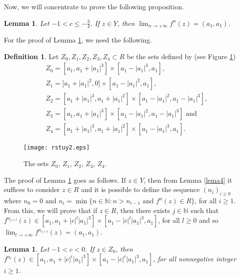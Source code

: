 \documentclass[11pt]{amsart}
\newtheorem{lemma}[theorem]{Lemma}
\theoremstyle{definition}
\newtheorem{definition}[theorem]{Definition}
\begin{document}
Now, we will concentrate to prove the following proposition.

\begin{lemma}
	Let $-1<c\leq -\frac{3}{4}$. If $z\in Y$, then $\displaystyle\lim_{n\to+\infty}f^n(z)=(a_1,a_1)$. \label{lemaaziai}
\end{lemma}

For the proof of Lemma \ref{lemaaziai}, we need the following.

\begin{definition}
	Let $Z_0, Z_1, Z_2, Z_3,Z_4 \subset R$ be the sets defined by (see Figure \ref{rstuy2})
	$$
	\begin{array}{l}
	Z_0=[a_1,a_1+|a_1|^3]\times [a_1-|a_1|^3,a_1], \\
	Z_1=]a_1+|a_1|^2,0]\times[a_1-|a_1|^2,a_1], \\
	Z_2=[a_1+|a_1|^3,a_1+|a_1|^2]\times[a_1-|a_1|^2,a_1-|a_1|^3], \\
	Z_3=[a_1,a_1+|a_1|^3]\times [a_1-|a_1|^2,a_1-|a_1|^3] \textrm{ and} \\
	Z_4=[a_1+|a_1|^3,a_1+|a_1|^2]\times [a_1-|a_1|^3,a_1].
	\end{array}
	$$
\end{definition}

\begin{figure}[h!]
	\centering
	\texttt{[image: rstuy2.eps]}
	\caption{The sets $Z_0$, $Z_1$, $Z_2$, $Z_3$, $Z_4$.} \label{rstuy2}
\end{figure}

The proof of Lemma \ref{lemaaziai} goes as follows. If $z\in Y$, then from Lemma \ref{lema4} it suffices to consider $z\in R$ and it is possible to define the sequence $(n_i)_{i\geq 0}$ where $n_0=0$ and $n_i=\min\{n\in\mathbb{N}: n>{n_{i-1}} \textrm{ and } f^n(z)\in R\}$, for all $i\geq 1$. From this, we will prove that if $z\in R$, then there exists $j\in\mathbb{N}$ such that $f^{n_{j+l}}(z)\in [a_1,a_1+|c|^l|a_1|^3]\times[a_1-|c|^l|a_1|^3,a_1]$, for all $l\geq 0$ and so $\displaystyle\lim_{l\to+\infty}f^{n_{j+l}}(z)=(a_1,a_1)$.


\begin{lemma}
Let $-1<c<0$. If $z\in Z_0$, then $f^{n_i}(z)\in [a_1,a_1+|c|^i|a_1|^3]\times[a_1- |c|^i|a_1|^3,a_1]$, for all nonnegative integer $i\geq 1$.\label{lemaazia0}
\end{lemma}
\end{document}
